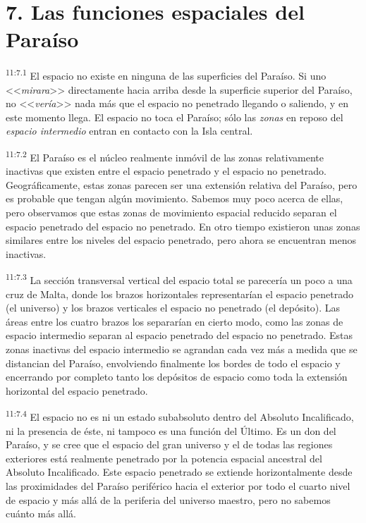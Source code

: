 \section*{7. Las funciones espaciales del Paraíso}
\par
\textsuperscript{11:7.1} El espacio no existe en ninguna de las superficies del Paraíso. Si uno <<\textit{mirara}>> directamente hacia arriba desde la superficie superior del Paraíso, no <<\textit{vería}>> nada más que el espacio no penetrado llegando o saliendo, y en este momento llega. El espacio no toca el Paraíso; sólo las \textit{zonas} en reposo del \textit{espacio intermedio} entran en contacto con la Isla central.

\par
\textsuperscript{11:7.2} El Paraíso es el núcleo realmente inmóvil de las zonas relativamente inactivas que existen entre el espacio penetrado y el espacio no penetrado. Geográficamente, estas zonas parecen ser una extensión relativa del Paraíso, pero es probable que tengan algún movimiento. Sabemos muy poco acerca de ellas, pero observamos que estas zonas de movimiento espacial reducido separan el espacio penetrado del espacio no penetrado. En otro tiempo existieron unas zonas similares entre los niveles del espacio penetrado, pero ahora se encuentran menos inactivas.

\par
\textsuperscript{11:7.3} La sección transversal vertical del espacio total se parecería un poco a una cruz de Malta, donde los brazos horizontales representarían el espacio penetrado (el universo) y los brazos verticales el espacio no penetrado (el depósito). Las áreas entre los cuatro brazos los separarían en cierto modo, como las zonas de espacio intermedio separan al espacio penetrado del espacio no penetrado. Estas zonas inactivas del espacio intermedio se agrandan cada vez más a medida que se distancian del Paraíso, envolviendo finalmente los bordes de todo el espacio y encerrando por completo tanto los depósitos de espacio como toda la extensión horizontal del espacio penetrado.

\par
\textsuperscript{11:7.4} El espacio no es ni un estado subabsoluto dentro del Absoluto Incalificado, ni la presencia de éste, ni tampoco es una función del Último. Es un don del Paraíso, y se cree que el espacio del gran universo y el de todas las regiones exteriores está realmente penetrado por la potencia espacial ancestral del Absoluto Incalificado. Este espacio penetrado se extiende horizontalmente desde las proximidades del Paraíso periférico hacia el exterior por todo el cuarto nivel de espacio y más allá de la periferia del universo maestro, pero no sabemos cuánto más allá.

